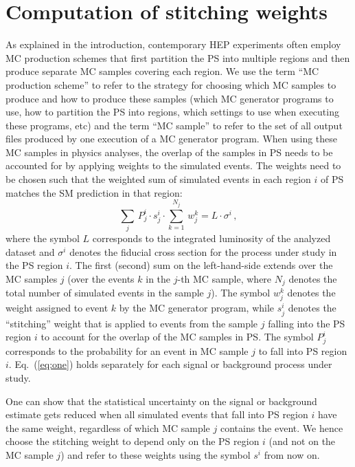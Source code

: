 \section{Computation of stitching weights}
\label{sec:stitching_weights}

As explained in the introduction,
contemporary HEP experiments often employ MC production schemes
that first partition the PS into multiple regions and then produce separate MC samples covering each region.
We use the term ``MC production scheme'' to refer to the strategy for choosing which MC samples to produce and how to produce these samples 
(which MC generator programs to use, how to partition the PS into regions, which settings to use when executing these programs, etc)
and the term ``MC sample'' to refer to the set of all output files produced by one execution of a MC generator program.
When using these MC samples in physics analyses,
the overlap of the samples in PS needs to be accounted for by applying weights to the simulated events.
The weights need to be chosen such that the weighted sum of simulated events in each region $i$ of PS 
matches the SM prediction in that region:
\begin{equation}
\sum_{j} \, P_{j}^{i} \cdot s_{j}^{i} \cdot \sum_{k=1}^{N_{j}} \, w_{j}^{k} = L \cdot \sigma^{i} \, ,
\label{eq:one}
\end{equation}
where the symbol $L$ corresponds to the integrated luminosity of the analyzed dataset
and $\sigma^{i}$ denotes the fiducial cross section for the process under study in the PS region $i$.
The first (second) sum on the left-hand-side extends over the MC samples $j$ 
(over the events $k$ in the $j$-th MC sample, where $N_{j}$ denotes the total number of simulated events in the sample $j$).
The symbol $w_{j}^{k}$ denotes the weight assigned to event $k$ by the MC generator program,
while $s_{j}^{i}$ denotes the ``stitching'' weight that is applied to events from the sample $j$ falling into the PS region $i$ to account for the overlap of the MC samples in PS.
The symbol $P_{j}^{i}$ corresponds to the probability for an event in MC sample $j$ to fall into PS region $i$.
Eq.~(\ref{eq:one}) holds separately for each signal or background process under study.

One can show that the statistical uncertainty on the signal or background estimate
gets reduced when all simulated events that fall into PS region $i$ have the same weight,
regardless of which MC sample $j$ contains the event.
We hence choose the stitching weight to depend only on the PS region $i$ (and not on the MC sample $j$)
and refer to these weights using the symbol $s^{i}$ from now on.


